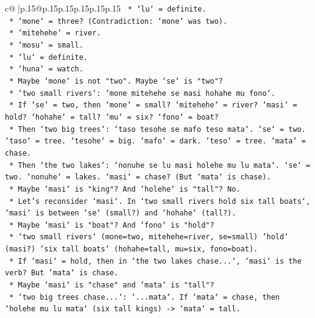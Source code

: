 \documentclass{article}
\begin{document}
{\begin{supertabular}{c@{$\;$}|p{.15\linewidth}@{}p{.15\linewidth}p{.15\linewidth}p{.15\linewidth}p{.15\linewidth}p{.15\linewidth}}
{{{\texttt{                        *   `lu` = definite.} \\
\texttt{                        *   `mone` = three? (Contradiction: `mone` was two).} \\
\texttt{                        *   `mitehehe` = river.} \\
\texttt{                        *   `mosu` = small.} \\
\texttt{                        *   `lu` = definite.} \\
\texttt{                        *   `huna` = watch.} \\
\texttt{            *   Maybe `mone` is not "two". Maybe `se` is "two"?} \\
\texttt{                *   `two small rivers`: `mone mitehehe se masi hohahe mu fono`.} \\
\texttt{                    *   If `se` = two, then `mone` = small? `mitehehe` = river? `masi` = hold? `hohahe` = tall? `mu` = six? `fono` = boat?} \\
\texttt{                    *   Then `two big trees`: `taso tesohe se mafo teso mata`. `se` = two. `taso` = tree. `tesohe` = big. `mafo` = dark. `teso` = tree. `mata` = chase.} \\
\texttt{                    *   Then `the two lakes`: `nonuhe se lu masi holehe mu lu mata`. `se` = two. `nonuhe` = lakes. `masi` = chase? (But `mata` is chase).} \\
\texttt{                    *   Maybe `masi` is "king"? And `holehe` is "tall"? No.} \\
\texttt{                    *   Let's reconsider `masi`. In `two small rivers hold six tall boats`, `masi` is between `se` (small?) and `hohahe` (tall?).} \\
\texttt{                    *   Maybe `masi` is "boat"? And `fono` is "hold"?} \\
\texttt{                        *   `two small rivers` (mone=two, mitehehe=river, se=small) `hold` (masi?) `six tall boats` (hohahe=tall, mu=six, fono=boat).} \\
\texttt{                        *   If `masi` = hold, then in `the two lakes chase...`, `masi` is the verb? But `mata` is chase.} \\
\texttt{                        *   Maybe `masi` is "chase" and `mata` is "tall"?} \\
\texttt{                            *   `two big trees chase...`: `...mata`. If `mata` = chase, then `holehe mu lu mata` (six tall kings) {-}> `mata` = tall.} \\
}}}
\end{supertabular}}
\end{document}
